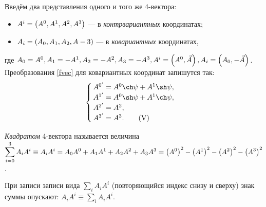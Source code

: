     Введём два представления одного и того же 4-вектора:
    \begin{itemize}
        \item $A^i = \left({A^0, A^1, A^2, A^3}\right) $ --- в \textit{контрвариантных} координатах;
        \item $A_i = \left({A_0, A_1, A_2, A-3}\right) $ --- в \textit{ковариантных} координатах,
    \end{itemize}
    где $A_0 = A^0, A_1 = -A^1, A_2 = -A^2, A_3 = -A^3, A^i = \left({A^0, \vec A}\right), A_i = \left({A_0, -\vec A}\right)$.
    Преобразования \ref{fvec} для ковариантных координат запишутся так:
        \[ \begin{cases}
            A^{0'} = A^0 \ch \psi + A^1 \sh \psi, \\
            A^{1'} = A^0 \sh \psi + A^1 \ch \psi, \\
            A^{2'} = A^2, \\
            A^{3'} = A^3. \tag{\Romannum{5}} \label{cfvec}
        \end{cases} \]
    \begin{Def}
        \textit{Квадратом} 4-вектора называется величина $\displaystyle \sum_{i=0}^3 A_i A^i \equiv A_i A^i = A_0 A^0 + A_1 A^1 + A_2 A^2 + A_3 A^3 = 
        \left({A^0}\right)^2 - \left({A^1}\right)^2 - \left({A^2}\right)^2 - \left({A^3}\right)^2$.
    \end{Def}
        \begin{note}
        При записи записи вида $\displaystyle \sum_i A_i A^i$ (повторяющийся индекс снизу и сверху) знак суммы опускают:
        $\displaystyle A_i A^i \equiv \sum_i A_i A^i$.
    \end{note}

